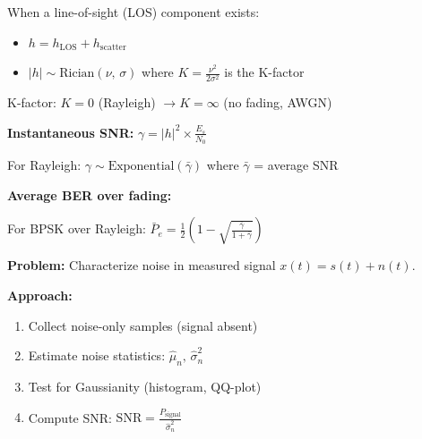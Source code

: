 When a line-of-sight (LOS) component exists:

\begin{itemize}
\tightlist
\item
  $h = h_{\mathrm{LOS}} + h_{\mathrm{scatter}}$
\item
  $\lvert h\rvert \sim \mathrm{Rician}(\nu,\, \sigma)$ where $K = \frac{\nu^{2}}{2\sigma^{2}}$ is the K-factor
\end{itemize}

K-factor: $K = 0$ (Rayleigh) $\to K = \infty$ (no fading, AWGN)


\textbf{Instantaneous SNR:} $\gamma = \lvert h\rvert^{2} \times \frac{E_{s}}{N_{0}}$

For Rayleigh: $\gamma \sim \mathrm{Exponential}(\bar{\gamma})$ where $\bar{\gamma}$ = average SNR

\textbf{Average BER over fading:}

For BPSK over Rayleigh: $\bar{P}_{e} = \frac{1}{2}\left(1 - \sqrt{\frac{\bar{\gamma}}{1+\bar{\gamma}}}\right)$



\textbf{Problem:} Characterize noise in measured signal $x(t) = s(t) + n(t)$.

\textbf{Approach:}

\begin{enumerate}
\def\labelenumi{\arabic{enumi}.}
\tightlist
\item
  Collect noise-only samples (signal absent)
\item
  Estimate noise statistics: $\hat{\mu}_{n},\, \hat{\sigma}^{2}_{n}$
\item
  Test for Gaussianity (histogram, QQ-plot)
\item
  Compute SNR: $\mathrm{SNR} = \frac{P_{\mathrm{signal}}}{\hat{\sigma}^{2}_{n}}$
\end{enumerate}


